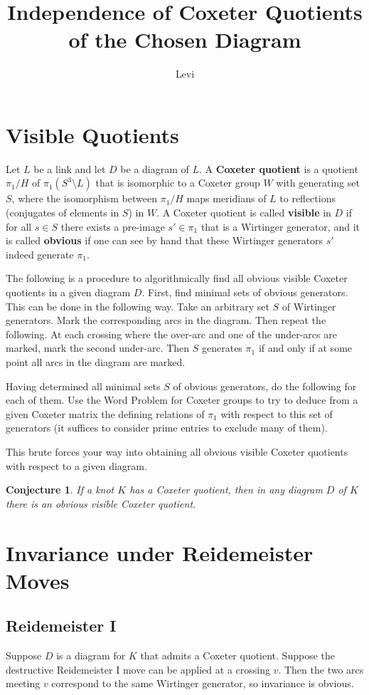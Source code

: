 \documentclass{article}\usepackage{amsthm}
\title{Independence of Coxeter Quotients of the Chosen Diagram}
\author{Levi}
\newtheorem{conjecture}[theorem]{Conjecture}
\begin{document}
\maketitle
\section{Visible Quotients}
Let $L$ be a link and let $D$ be a diagram of $L$.
A \textbf{Coxeter quotient} is a quotient $\pi_1/H$ of $\pi_1(S^3 \setminus L)$ that is isomorphic to a Coxeter group $W$ with generating set $S$, where the isomorphism between $\pi_1/H$ maps meridians of $L$ to reflections (conjugates of elements in $S$) in $W$. A Coxeter quotient is called \textbf{visible} in $D$ if for all $s \in S$ there exists a pre-image $s' \in \pi_1$ that is a Wirtinger generator, and it is called \textbf{obvious} if one can see by hand that these Wirtinger generators $s'$ indeed generate $\pi_1$.

The following is a procedure to algorithmically find all obvious visible Coxeter quotients in a given diagram $D$. First, find minimal sets of obvious generators. This can be done in the following way. Take an arbitrary set $S$ of Wirtinger generators. Mark the corresponding arcs in the diagram. Then repeat the following. At each crossing where the over-arc and one of the under-arcs are marked, mark the second under-arc. Then $S$ generates $\pi_1$ if and only if at some point all arcs in the diagram are marked.

Having determined all minimal sets $S$ of obvious generators, do the following for each of them. Use the Word Problem for Coxeter groups to try to deduce from a given Coxeter matrix the defining relations of $\pi_1$ with respect to this set of generators (it suffices to consider prime entries to exclude many of them). 

This brute forces your way into obtaining all obvious visible Coxeter quotients with respect to a given diagram.

\begin{conjecture}
If a knot $K$ has a Coxeter quotient, then in any diagram $D$ of $K$ there is an obvious visible Coxeter quotient.
\end{conjecture}

\section{Invariance under Reidemeister Moves}
\subsection{Reidemeister I}
Suppose $D$ is a diagram for $K$ that admits a Coxeter quotient. Suppose the destructive Reidemeister I move can be applied at a crossing $v$. Then the two arcs meeting $v$ correspond to the same Wirtinger generator, so invariance is obvious.
\end{document}
